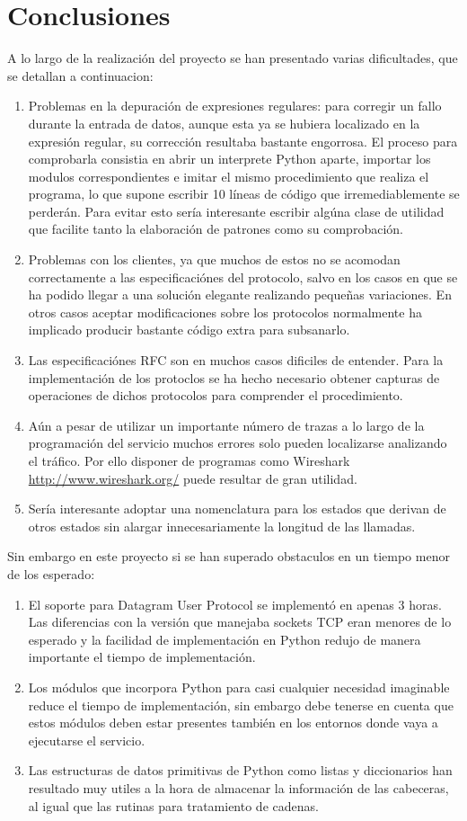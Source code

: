 \documentclass[a4paper,spanish,12pt]{book}
\begin{document}
\section{Conclusiones}
A lo largo de la realización del proyecto se han presentado varias dificultades, que se detallan a continuacion:
\begin{enumerate}
	\item Problemas en la depuración de expresiones regulares: para corregir un fallo durante la entrada de datos, aunque esta ya se hubiera localizado en la expresión regular, su corrección resultaba bastante engorrosa. El proceso para comprobarla consistia en abrir un interprete Python aparte, importar los modulos correspondientes e imitar el mismo procedimiento que realiza el programa, lo que supone escribir 10 líneas de código que irremediablemente se perderán. Para evitar esto sería interesante escribir algúna clase de utilidad que facilite tanto la elaboración de patrones como su comprobación.
	\item Problemas con los clientes, ya que muchos de estos no se acomodan correctamente a las especificaciónes del protocolo, salvo en los casos en que se ha podido llegar a una solución elegante realizando pequeñas variaciones. En otros casos aceptar modificaciones sobre los protocolos normalmente ha implicado producir bastante código extra para subsanarlo.
	\item Las especificaciónes RFC son en muchos casos dificiles de entender. Para la implementación de los protoclos se ha hecho necesario obtener capturas de operaciones de dichos protocolos para comprender el procedimiento.
	\item Aún a pesar de utilizar un importante número de trazas a lo largo de la programación del servicio muchos errores solo pueden localizarse analizando el tráfico. Por ello disponer de programas como Wireshark \url{http://www.wireshark.org/} puede resultar de gran utilidad.
	\item Sería interesante adoptar una nomenclatura para los estados que derivan de otros estados sin alargar innecesariamente la longitud de las llamadas.
\end{enumerate}
Sin embargo en este proyecto si se han superado obstaculos en un tiempo menor de los esperado:
\begin{enumerate}
	\item El soporte para Datagram User Protocol se implementó en apenas 3 horas. Las diferencias con la versión que manejaba sockets TCP eran menores de lo esperado y la facilidad de implementación en Python redujo de manera importante el tiempo de implementación.
	\item Los módulos que incorpora Python para casi cualquier necesidad imaginable reduce el tiempo de implementación, sin embargo debe tenerse en cuenta que estos módulos deben estar presentes tambi\'en en los entornos donde vaya a ejecutarse el servicio.
	\item Las estructuras de datos primitivas de Python como listas y diccionarios han resultado muy utiles a la hora de almacenar la información de las cabeceras, al igual que las rutinas para tratamiento de cadenas.
\end{enumerate}
\end{document}
